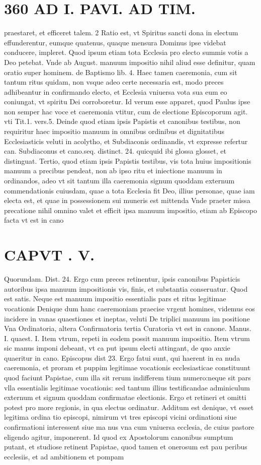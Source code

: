 \documentclass{article}
\begin{document}
\begin{pages}
\section*{360 AD I. PAVI. AD TIM. }\pstart praestaret, et efficeret talem. 2 Ratio est, vt Spiritus sancti dona in electum effunderentur, eumque quatenus, quaque mensura Dominus ipse videbat conducere, impleret. Quod ipsum etiam tota Ecclesia pro electo summis votis a Deo petebat. Vnde ab August. manuum impositio nihil aliud esse definitur, quam oratio super hominem. de Baptismo lib. 4. Haec tamen caeremonia, cum sit tantum ritus quidam, non vsque adeo certe necessaria est, modo preces adhibeantur in confirmando electo, et Ecclesia vniuersa vota sua eum eo coniungat, vt spiritu Dei corroboretur. Id verum esse apparet, quod Paulus ipse non semper hac voce et caeremonia vtitur, cum de electione Episcoporum agit. vti Tit.1. vers.5. Deinde quod etiam ipsis Papistis et canonibus testibus, non requiritur haec impositio manuum in omnibus ordinibus et dignitatibus Ecclesiasticis veluti in acolytho, et Subdiaconis ordinandis, vt expresse refertur can. Subdiaconus et cano.seq. distinct. 24. quicquid ibi glossa glosset, et distinguat. Tertio, quod etiam ipsis Papistis testibus, vis tota huius impositionis manuum a precibus pendeat, non ab ipso ritu et iniectione manuum in ordinandos, adeo vt sit tantum illa caeremonia signum quoddam externum commendationis cuiusdam, quae a tota Ecclesia fit Deo, illius personae, quae iam electa est, et quae in possessionem sui muneris est mittenda Vnde praeter missa precatione nihil omnino valet et efficit ipsa manuum impositio, etiam ab Episcopo facta vt est in cano  \pend
\section*{CAPVT . V. }
\marginpar{[ p.361 ]}\pstart Quorundam. Dist. 24. Ergo cum preces retinentur, ipsis canonibus Papisticis autoribus ipsa manuum impositionis vis, finis, et substantia conseruatur. Quod est satis. Neque est manuum impositio essentialis pars et ritus legitimae vocationis Denique dum hanc caeremoniam praecise vrgent homines, videmus eos incidere in vanas quaestiones et ineptas, veluti De triplici manuum im positione Vna Ordinatoria, altera Confirmatoria tertia Curatoria vt est in canone. Manus. I. quaest. I. Item vtrum, repeti in eodem possit manuum impositio. Item vtrum sic manus imponi debeant, vt ca put ipsum electi attingant, de quo anxie quaeritur in cano. Episcopus dist 23. Ergo fatui sunt, qui haerent in ea nuda caeremonia, et proram et puppim legitimae vocationis ecclesiasticae constituunt quod faciunt Papistae, cum illa sit rerum indifferem tium numero:neque sit pars vlla essentialis legitimae vocationis: sed tantum illius testificandae adminiculum externum et signum quoddam confirmatae electionis. Ergo et retineri et omitti potest pro more regionis, in qua electus ordinatur. Additum est denique, vt esset legitima ordina tio episcopi, nimirum vt tres episcopi vicini ordinationi siue confirmationi interessent siue ma nus vna cum vniuersa ecclesia, de cuius pastore eligendo agitur, imponerent. Id quod ex Apostolorum canonibus sumptum putant, et studiose retinent Papistae, quod tamen et onerosum est pau peribus ecclesiis, et ad ambitionem et pompam  \pend

\end{pages}
\end{document}
